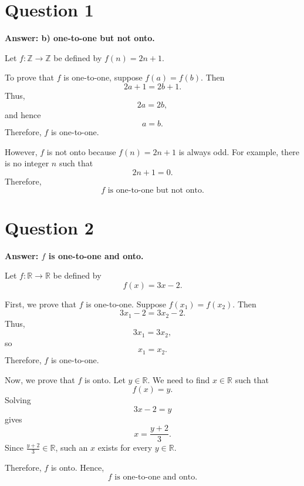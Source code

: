 
\section*{Question 1}

\textbf{Answer: b) one-to-one but not onto.}

Let $f:\mathbb{Z}\to\mathbb{Z}$ be defined by $f(n)=2n+1$.

To prove that $f$ is one-to-one, suppose $f(a)=f(b)$. Then
\[
2a+1=2b+1.
\]
Thus,
\[
2a=2b,
\]
and hence
\[
a=b.
\]
Therefore, $f$ is one-to-one.

However, $f$ is not onto because $f(n)=2n+1$ is always odd. For example, there is no
integer $n$ such that
\[
2n+1=0.
\]
Therefore,
\[
\boxed{\text{$f$ is one-to-one but not onto.}}
\]

\section*{Question 2}

\textbf{Answer: $f$ is one-to-one and onto.}

Let $f:\mathbb{R}\to\mathbb{R}$ be defined by
\[
f(x)=3x-2.
\]

First, we prove that $f$ is one-to-one. Suppose $f(x_1)=f(x_2)$. Then
\[
3x_1-2=3x_2-2.
\]
Thus,
\[
3x_1=3x_2,
\]
so
\[
x_1=x_2.
\]
Therefore, $f$ is one-to-one.

Now, we prove that $f$ is onto. Let $y\in\mathbb{R}$. We need to find
$x\in\mathbb{R}$ such that
\[
f(x)=y.
\]
Solving
\[
3x-2=y
\]
gives
\[
x=\frac{y+2}{3}.
\]
Since $\frac{y+2}{3}\in\mathbb{R}$, such an $x$ exists for every
$y\in\mathbb{R}$.

Therefore, $f$ is onto. Hence,
\[
\boxed{\text{$f$ is one-to-one and onto.}}
\]